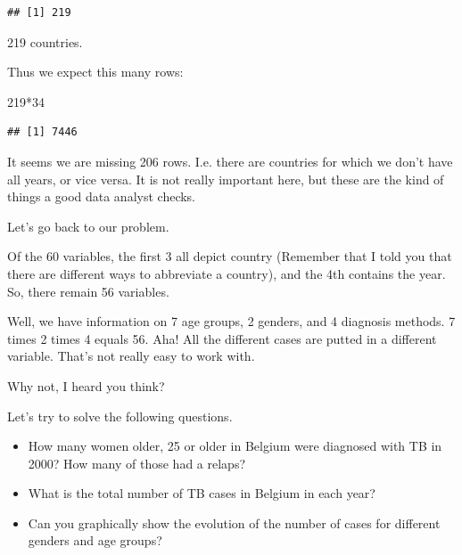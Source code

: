 \documentclass[]{tufte-book}
\newenvironment{Shaded}{}{}
\newcommand{\DecValTok}[1]{\textcolor[rgb]{0.25,0.63,0.44}{#1}}
\newcommand{\KeywordTok}[1]{\textcolor[rgb]{0.00,0.44,0.13}{\textbf{#1}}}
\newcommand{\NormalTok}[1]{#1}
\newcommand{\OperatorTok}[1]{\textcolor[rgb]{0.40,0.40,0.40}{#1}}
\newcommand{\StringTok}[1]{\textcolor[rgb]{0.25,0.44,0.63}{#1}}
\providecommand{\tightlist}{%
  \setlength{\itemsep}{0pt}\setlength{\parskip}{0pt}}
\begin{document}
\begin{Shaded}
\end{Shaded}

\begin{verbatim}
## [1] 219
\end{verbatim}

219 countries.

Thus we expect this many rows:

\begin{Shaded}
\begin{Highlighting}[]
\DecValTok{219}\OperatorTok{*}\DecValTok{34}
\end{Highlighting}
\end{Shaded}

\begin{verbatim}
## [1] 7446
\end{verbatim}

It seems we are missing 206 rows. I.e. there are countries for which we don't have all years, or vice versa. It is not really important here, but these are the kind of things a good data analyst checks.

Let's go back to our problem.

Of the 60 variables, the first 3 all depict country (Remember that I told you that there are different ways to abbreviate a country), and the 4th contains the year. So, there remain 56 variables.

Well, we have information on 7 age groups, 2 genders, and 4 diagnosis methods. 7 times 2 times 4 equals 56. Aha! All the different cases are putted in a different variable. That's not really easy to work with.

Why not, I heard you think?

Let's try to solve the following questions.

\begin{itemize}
\tightlist
\item
  How many women older, 25 or older in Belgium were diagnosed with TB in 2000? How many of those had a relaps?
\item
  What is the total number of TB cases in Belgium in each year?
\item
  Can you graphically show the evolution of the number of cases for different genders and age groups?
\end{itemize}
\end{document}
